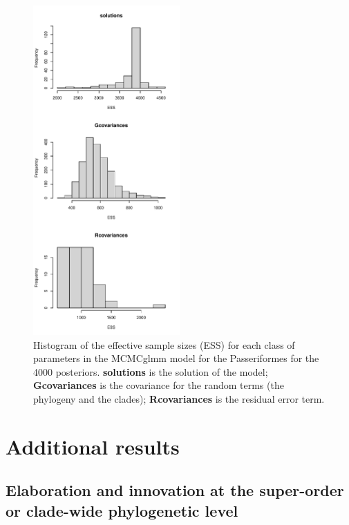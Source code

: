 \documentclass[12pt,a4paper]{article}
\begin{document}
\begin{figure}[H]
\centering
   \includegraphics[width=0.5\textwidth]{Figures/parameters_ESS_passeriformes.pdf}
\caption{Histogram of the effective sample sizes (ESS) for each class of parameters in the MCMCglmm model for the Passeriformes for the 4000 posteriors. \textbf{solutions} is the solution of the model; \textbf{Gcovariances} is the covariance for the random terms (the phylogeny and the clades); \textbf{Rcovariances} is the residual error term.}
\label{Fig:model_ess_passeriformes}
\end{figure}

%
%

\newpage
\section{Additional results}
\subsection{Elaboration and innovation at the super-order or clade-wide phylogenetic level}
\end{document}
